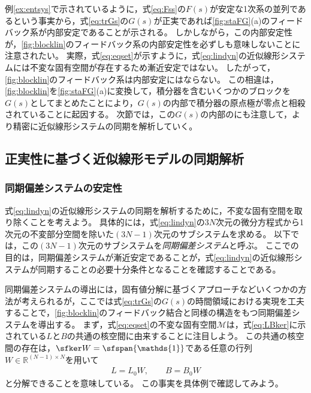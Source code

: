 \documentclass[tombow,dvipdfmx]{corona-a5}
\begin{document}
例\ref{ex:entsys}で示されているように，式\ref{eq:Fss}の$F(s)$が安定な1次系の並列であるという事実から，式\ref{eq:trGs}の$G(s)$が正実であれば\ref{fig:staFG}(a)のフィードバック系が内部安定であることが示される。
しかしながら，この内部安定性が，\ref{fig:blocklin}のフィードバック系の内部安定性を必ずしも意味しないことに注意されたい。
実際，式\ref{eq:eqset}が示すように，式\ref{eq:lindyn}の近似線形システムには不変な固有空間が存在するため漸近安定ではない。
したがって，\ref{fig:blocklin}のフィードバック系は内部安定にはならない。
この相違は，\ref{fig:blocklin}を\ref{fig:staFG}(a)に変換して，積分器を含むいくつかのブロックを$G(s)$としてまとめたことにより，$G(s)$の内部で積分器の原点極が零点と相殺されていることに起因する。
次節では，この$G(s)$の内部のにも注意して，より精密に近似線形システムの同期を解析していく。

\subsection{正実性に基づく近似線形モデルの同期解析}\label{sec:syncanp}

\subsubsection{同期偏差システムの安定性}

式\ref{eq:lindyn}の近似線形システムの同期を解析するために，不変な固有空間を取り除くことを考えよう。
具体的には，式\ref{eq:lindyn}の$3N$次元の微分方程式から1次元の不変部分空間を除いた$(3N-1)$次元のサブシステムを求める。
以下では，この$(3N-1)$次元のサブシステムを\emph{同期偏差システム}と呼ぶ。
ここでの目的は，同期偏差システムが漸近安定であることが，式\ref{eq:lindyn}の近似線形システムが同期することの必要十分条件となることを確認することである。


同期偏差システムの導出には，固有値分解に基づくアプローチなどいくつかの方法が考えられるが，ここでは式\ref{eq:trGs}の$G(s)$の時間領域における実現を工夫することで，\ref{fig:blocklin}のフィードバック結合と同様の構造をもつ同期偏差システムを導出する。
まず，式\ref{eq:eqset}の不変な固有空間$\mathcal{M}$は，式\ref{eq:LBker}に示されている$L$と$B$の共通の核空間に由来することに注目しよう。
この共通の核空間の存在は，$\sfker W = \sfspan\{ \mathds{1}\}$である任意の行列$W \in \mathbb{R}^{(N-1)\times N}$を用いて
\begin{align}\label{eq:decLB}
L = L_0 W 
,\qquad
B = B_0 W 
\end{align}
と分解できることを意味している。
この事実を具体例で確認してみよう。
\end{document}
